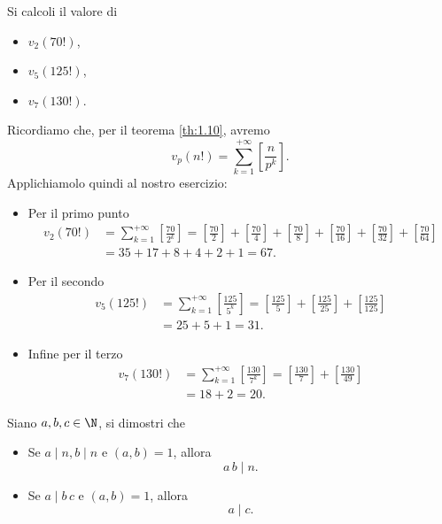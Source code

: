\begin{exeN}\label{ex:1.2}
	Si calcoli il valore di
	\begin{itemize}
		\item \(v_2(70!)\),
		\item \(v_5(125!)\),
		\item \(v_7(130!)\).
	\end{itemize}
\end{exeN}

\begin{sol}
	Ricordiamo che, per il teorema \ref{th:1.10}, avremo
	\[
		v_p(n!)=\sum_{k=1}^{+\infty}\left[\frac{n}{p^k}\right].
	\]
	Applichiamolo quindi al nostro esercizio:
	\begin{itemize}
		\item Per il primo punto
		      \[
			      \begin{split}
				      v_2(70!) &= \sum_{k=1}^{+\infty}\left[\frac{70}{2^k}\right]=\left[\frac{70}{2}\right]+\left[\frac{70}{4}\right]+\left[\frac{70}{8}\right]+\left[\frac{70}{16}\right]+\left[\frac{70}{32}\right]+\left[\frac{70}{64}\right]\\
				      & =35+17+8+4+2+1=67.
			      \end{split}
		      \]
		\item Per il secondo
		      \[
			      \begin{split}
				      v_5(125!) &= \sum_{k=1}^{+\infty}\left[\frac{125}{5^k}\right]=\left[\frac{125}{5}\right]+\left[\frac{125}{25}\right]+\left[\frac{125}{125}\right]\\
				      & =25+5+1=31.
			      \end{split}
		      \]
		\item Infine per il terzo
		      \[
			      \begin{split}
				      v_7(130!) &= \sum_{k=1}^{+\infty}\left[\frac{130}{7^k}\right]=\left[\frac{130}{7}\right]+\left[\frac{130}{49}\right]\\
				      & =18+2=20.
			      \end{split}
		      \]
	\end{itemize}
\end{sol}

\begin{exeN}\label{ex:1.3}
	Siano \(a,b,c\in\N\), si dimostri che
	\begin{itemize}
		\item Se \(a\mid n,b\mid n\) e \((a,b)=1\), allora
		      \[
			      a\,b\mid n.
		      \]
		\item Se \(a\mid b\,c\) e \((a,b)=1\), allora
		      \[
			      a\mid c.
		      \]
	\end{itemize}
\end{exeN}

